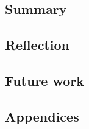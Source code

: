 \documentclass{l4proj}
\begin{document}
\section{Summary}

\section{Reflection}

\section{Future work}

%
% 

\begin{appendices}

\chapter{Appendices}







\end{appendices}
\end{document}
